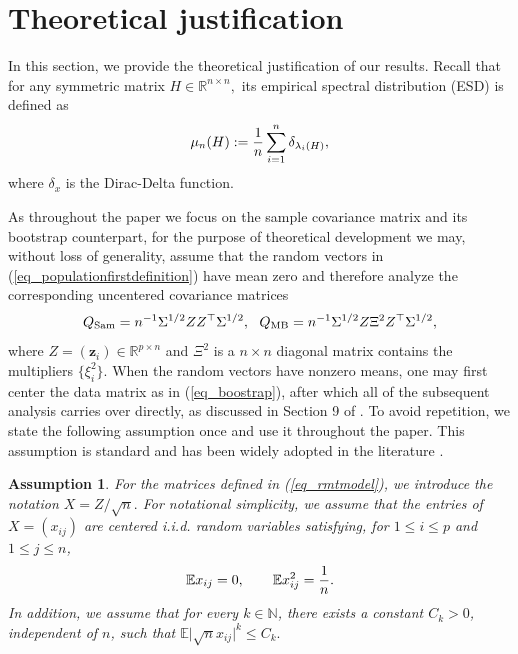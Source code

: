 \documentclass[12pt]{article}
\def\zb{\mathbf z}
\theoremstyle{plain}
\newtheorem{assumption}{Assumption}[section]
\numberwithin{equation}{section}
\begin{document}
\section{Theoretical justification}\label{sec_theory}
In this section, we provide the theoretical justification of our results. Recall that for any symmetric matrix $H \in \mathbb{R}^{n \times n},$ its empirical spectral distribution (ESD) is defined as \vspace*{-10pt}
\begin{equation*}
	\vspace*{-10pt}
	\mu_n(H):=\frac{1}{n} \sum_{i=1}^n \delta_{\lambda_i(H)},
\end{equation*}
where $\delta_x$ is the Dirac-Delta function.

As throughout the paper we focus on the sample covariance matrix and its bootstrap counterpart, for the purpose of theoretical development we may, without loss of generality, assume that the random vectors in (\ref{eq_populationfirstdefinition}) have mean zero and therefore analyze the corresponding uncentered covariance matrices\vspace*{-10pt}
\begin{equation}\label{eq_rmtmodel}
	\vspace*{-10pt}
	Q_{\text{Sam}}=n^{-1}\Sigma^{1/2}ZZ^\top \Sigma^{1/2}, \ \  Q_{\text{MB}}=n^{-1}\Sigma^{1/2}Z \Xi^2 Z^\top \Sigma^{1/2},
\end{equation}
where $Z=(\zb_i) \in \mathbb{R}^{p \times n}$ and $\Xi^2$ is a $n \times n$ diagonal matrix contains the multipliers $\{\xi_i^2\}.$ When the random vectors have nonzero means, one may first center the data matrix as in (\ref{eq_boostrap}), after which all of the subsequent analysis carries over directly, as discussed in Section 9 of \citep{bloemendal2016principal}. To avoid repetition, we state the following assumption once and use it throughout the paper. This assumption is standard and has been widely adopted in the literature \citep{YaoZhengBai2015}.

\begin{assumption}\label{assum_X}
	For the matrices defined in (\ref{eq_rmtmodel}), we introduce the notation $X=Z/\sqrt{n}.$ For notational simplicity, we assume that the entries of $X=(x_{ij})$ are centered i.i.d. random variables satisfying, for $1\le i\le p$ and $1\le j\le n$, \vspace*{-10pt}
	\begin{equation}\label{eq_standard1n}
		\vspace*{-10pt}
		\mathbb{E}x_{ij}=0,\qquad \mathbb{E}x_{ij}^{2}=\frac{1}{n}.
	\end{equation}
	In addition, we assume that for every $k\in\mathbb{N}$, there exists a constant $C_k>0$, independent of $n$, such that
	$\mathbb{E}\bigl|\sqrt{n}x_{ij}\bigr|^{k}\le C_k.$
\end{assumption}
\end{document}
